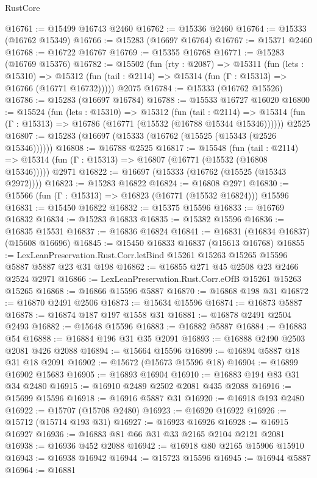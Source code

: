 \begin{lexlean}{RustCore}
\begin{coremodule}
@16761 := @15499 @16743 @2460
@16762 := @15336 @2460
@16764 := @15333 (@16762 @15349)
@16766 := @15283 (@16697 @16764)
@16767 := @15371 @2460
@16768 := @16722 @16767
@16769 := @15355 @16768
@16771 := @15283 (@16769 @15376)
@16782 := @15502
    (fun (rty : @2087) =>
    @15311
      (fun (lets : @15310) =>
      @15312 (fun (tail : @2114) => @15314 (fun (Γ : @15313) => @16766 (@16771 @16732)))))
    @2075
@16784 := @15333 (@16762 @15526)
@16786 := @15283 (@16697 @16784)
@16788 := @15533 @16727 @16020
@16800 := @15524
    (fun (lets : @15310) =>
    @15312
      (fun (tail : @2114) =>
      @15314 (fun (Γ : @15313) => @16786 (@16771 (@15532 (@16788 @15344 @15346))))))
    @2525
@16807 := @15283 (@16697 (@15333 (@16762 (@15525 (@15343 (@2526 @15346))))))
@16808 := @16788 @2525
@16817 := @15548
    (fun (tail : @2114) => @15314 (fun (Γ : @15313) => @16807 (@16771 (@15532 (@16808 @15346)))))
    @2971
@16822 := @16697 (@15333 (@16762 (@15525 (@15343 @2972))))
@16823 := @15283 @16822
@16824 := @16808 @2971
@16830 := @15566 (fun (Γ : @15313) => @16823 (@16771 (@15532 @16824))) @15596
@16831 := @15450 @16822
@16832 := @15375 @15596
@16833 := @16769 @16832
@16834 := @15283 @16833
@16835 := @15382 @15596
@16836 := @16835 @15531
@16837 := @16836 @16824
@16841 := @16831 (@16834 @16837) (@15608 @16696)
@16845 := @15450 @16833 @16837 (@15613 @16768)
@16855 := LexLeanPreservation.Rust.Corr.letBind @15261 @15263 @15265 @15596 @5887 @5887 @23 @31 @198
@16862 := @16855 @271 @45 @2508 @23 @2466 @2524 @2971
@16866 := LexLeanPreservation.Rust.Corr.eOfB @15261 @15263 @15265
@16868 := @16866 @15596 @5887
@16870 := @16868 @198 @31
@16872 := @16870 @2491 @2506
@16873 := @15634 @15596
@16874 := @16873 @5887
@16878 := @16874 @187 @197 @1558 @31
@16881 := @16878 @2491 @2504 @2493
@16882 := @15648 @15596
@16883 := @16882 @5887
@16884 := @16883 @54
@16888 := @16884 @196 @31 @35 @2091
@16893 := @16888 @2490 @2503 @2081 @426 @2088
@16894 := @15664 @15596
@16899 := @16894 @5887 @18 @31 @18 @2091
@16902 := @15672 (@15673 @15596 @18)
@16904 := @16899 @16902 @15683
@16905 := @16893 @16904
@16910 := @16883 @194 @83 @31 @34 @2480
@16915 := @16910 @2489 @2502 @2081 @435 @2088
@16916 := @15699 @15596
@16918 := @16916 @5887 @31
@16920 := @16918 @193 @2480
@16922 := @15707 (@15708 @2480)
@16923 := @16920 @16922
@16926 := @15712 (@15714 @193 @31)
@16927 := @16923 @16926
@16928 := @16915 @16927
@16936 := @16883 @81 @66 @31 @33 @2165 @2104 @2121 @2081
@16938 := @16936 @452 @2088
@16942 := @16918 @80 @2165 @15906 @15910
@16943 := @16938 @16942
@16944 := @15723 @15596
@16945 := @16944 @5887
@16964 := @16881

\end{coremodule}
\end{lexlean}

